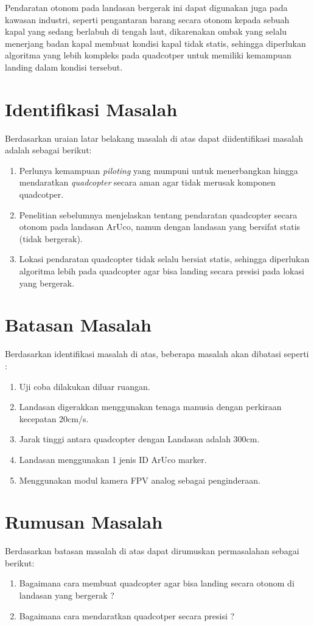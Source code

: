 Pendaratan otonom pada landasan bergerak ini dapat digunakan juga pada kawasan industri, seperti pengantaran barang secara otonom kepada sebuah kapal yang sedang berlabuh di tengah laut, dikarenakan ombak yang selalu menerjang badan kapal membuat kondisi kapal tidak statis, sehingga diperlukan algoritma yang lebih kompleks pada quadcotper untuk memiliki kemampuan landing dalam kondisi tersebut.

\section{Identifikasi Masalah}
Berdasarkan uraian latar belakang masalah di atas dapat diidentifikasi masalah adalah sebagai berikut:
\begin{enumerate}
	\item Perlunya kemampuan \textit{piloting} yang mumpuni untuk menerbangkan hingga mendaratkan \textit{quadcopter} secara aman agar tidak merusak komponen quadcotper.
	\item Penelitian sebelumnya menjelaskan tentang pendaratan quadcopter secara otonom pada landasan ArUco, namun dengan landasan yang bersifat statis (tidak bergerak).
	\item Lokasi pendaratan quadcopter tidak selalu bersiat statis, sehingga diperlukan algoritma lebih pada quadcopter agar bisa landing secara presisi pada lokasi yang bergerak.
\end{enumerate}

\section{Batasan Masalah}
Berdasarkan identifikasi masalah di atas, beberapa masalah akan dibatasi seperti :
\begin{enumerate}
	\item Uji coba dilakukan diluar ruangan.
	\item Landasan digerakkan menggunakan tenaga manusia dengan perkiraan kecepatan 20cm/s.
	\item Jarak tinggi antara quadcopter dengan Landasan adalah 300cm.
	\item Landasan menggunakan 1 jenis ID ArUco marker.
	\item Menggunakan modul kamera FPV analog sebagai penginderaan.
\end{enumerate}


\section{Rumusan Masalah}
Berdasarkan batasan masalah di atas dapat dirumuskan
permasalahan sebagai berikut:
\begin{enumerate}
	\item Bagaimana cara membuat quadcopter agar bisa landing secara otonom di landasan yang bergerak ?
	\item Bagaimana cara mendaratkan quadcotper secara presisi ?
\end{enumerate}

